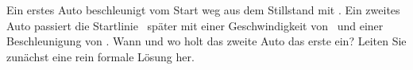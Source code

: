 Ein erstes Auto beschleunigt vom Start weg aus dem Stillstand mit \aRaO. Ein zweites Auto passiert die Startlinie \dtRO\ später mit einer Geschwindigkeit von \vRbO\ und einer Beschleunigung von \aRbO. Wann und wo holt das zweite Auto das erste ein? Leiten Sie zunächst eine rein formale Lösung her.
